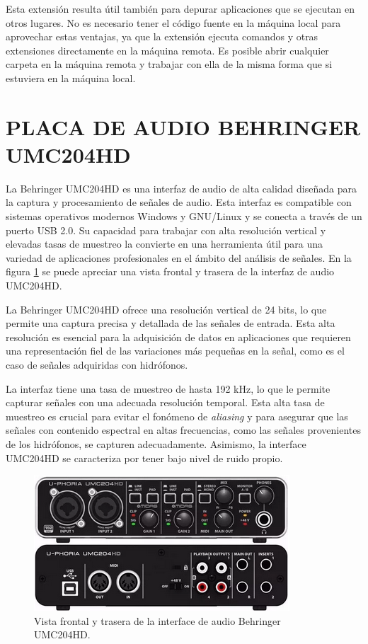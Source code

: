 Esta extensión resulta útil también para depurar aplicaciones que se ejecutan en otros lugares. No es necesario tener el código fuente en la máquina local para aprovechar estas ventajas, ya que la extensión ejecuta comandos y otras extensiones directamente en la máquina remota. Es posible abrir cualquier carpeta en la máquina remota y trabajar con ella de la misma forma que si estuviera en la máquina local.

\clearpage
\section{PLACA DE AUDIO BEHRINGER UMC204HD}

La Behringer UMC204HD es una interfaz de audio de alta calidad diseñada para la captura y procesamiento de señales de audio. Esta interfaz es compatible con sistemas operativos modernos Windows y GNU/Linux y se conecta a través de un puerto USB 2.0. Su capacidad para trabajar con alta resolución vertical y elevadas tasas de muestreo la convierte en una herramienta útil para una variedad de aplicaciones profesionales en el ámbito del análisis de señales. En la figura \ref{fig:placa} se puede apreciar una vista frontal y trasera de la interfaz de audio UMC204HD.

La Behringer UMC204HD ofrece una resolución vertical de 24 bits, lo que permite una captura precisa y detallada de las señales de entrada. Esta alta resolución es esencial para la adquisición de datos en aplicaciones que requieren una representación fiel de las variaciones más pequeñas en la señal, como es el caso de señales adquiridas con hidrófonos.

La interfaz tiene una tasa de muestreo de hasta 192 kHz, lo que le permite capturar señales con una adecuada resolución temporal. Esta alta tasa de muestreo es crucial para evitar el fonómeno de \textit{aliasing} y para asegurar que las señales con contenido espectral en altas frecuencias, como las señales provenientes de los hidrófonos, se capturen adecuadamente.  Asimismo, la interface UMC204HD se caracteriza por tener bajo nivel de ruido propio. 

\vspace{10px}
\begin{figure}[ht]
    \centering
    \includegraphics[width=.5\textwidth]{graficos/behringer.png}
    \caption[]{Vista frontal y trasera de la interface de audio Behringer UMC204HD.}
    \label{fig:placa}
\end{figure}

